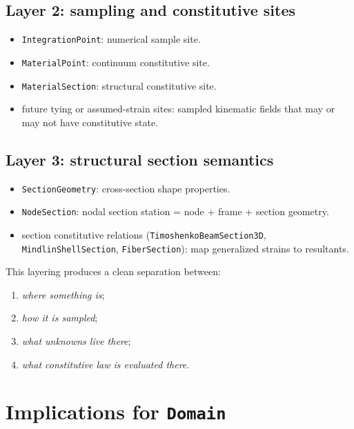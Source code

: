 \subsection{Layer 2: sampling and constitutive sites}

\begin{itemize}[nosep]
  \item \texttt{IntegrationPoint}:
        numerical sample site.
  \item \texttt{MaterialPoint}:
        continuum constitutive site.
  \item \texttt{MaterialSection}:
        structural constitutive site.
  \item future tying or assumed-strain sites:
        sampled kinematic fields that may or may not have constitutive state.
\end{itemize}

\subsection{Layer 3: structural section semantics}

\begin{itemize}[nosep]
  \item \texttt{SectionGeometry}:
        cross-section shape properties.
  \item \texttt{NodeSection}:
        nodal section station = node + frame + section geometry.
  \item section constitutive relations
        (\texttt{TimoshenkoBeamSection3D}, \texttt{MindlinShellSection},
        \texttt{FiberSection}):
        map generalized strains to resultants.
\end{itemize}

This layering produces a clean separation between:

\begin{enumerate}[nosep]
  \item \emph{where something is};
  \item \emph{how it is sampled};
  \item \emph{what unknowns live there};
  \item \emph{what constitutive law is evaluated there}.
\end{enumerate}


\section{Implications for \texttt{Domain}}
\label{sec:domain-ontology-domain}

